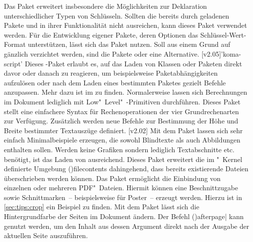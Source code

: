 \begin{DeclarePackages}
  Das Paket  erweitert insbesondere die Möglichkeiten zur 
  Deklaration unterschiedlicher Typen von Schlüsseln. Sollten die bereits durch 
  \TUDScript geladenen Pakete  und  in ihrer 
  Funktionalität nicht ausreichen, kann dieses Paket verwendet werden. Für die 
  Entwicklung eigener Pakete, deren Optionen das Schlüssel-Wert-Format 
  unterstützen, lässt sich das Paket  nutzen. Soll aus einem 
  Grund auf \KOMAScript gänzlich verzichtet werden, sind die Pakete 
   oder  eine Alternative.
[v2.05]'koma-script'
  Dieses \KOMAScript-Paket erlaubt es, auf das Laden von Klassen oder Paketen 
  direkt davor oder danach zu reagieren, um beispielsweise Paketabhängigkeiten 
  aufzulösen oder nach dem Laden eines bestimmten Paketes gezielt Befehle 
  anzupassen. Mehr dazu ist im \scrguide zu finden.
  Normalerweise lassen sich Berechnungen im Dokument lediglich mit 
  Low"~Level"~-Primitiven durchführen. Dieses Paket stellt eine 
  einfachere Syntax für Rechenoperationen der vier Grundrechenarten zur 
  Verfügung. Zusätzlich werden neue Befehle zur Bestimmung der Höhe und Breite 
  bestimmter Textauszüge definiert.
[v2.02]
  Mit dem Paket  lassen sich sehr einfach Minimalbeispiele 
  erzeugen, die sowohl Blindtexte als auch Abbildungen enthalten sollen. Werden 
  keine Grafiken sondern lediglich Textabschnitte etc. benötigt, ist das Laden 
  von  ausreichend.
  Dieses Paket erweitert die im "~Kernel definierte Umgebung 
  \Environment(){filecontents} dahingehend, 
  dass bereits existierende Dateien überschrieben werden können.
  Das Paket ermöglicht die Einbindung von einzelnen oder mehreren PDF"~Dateien.
  Hiermit können eine Beschnittzugabe sowie Schnittmarken~-- beispielsweise für 
  Poster~-- erzeugt werden. Hierzu ist in \autoref{sec:tips:crop} ein Beispiel 
  zu finden.
  Mit dem Paket lässt sich die Hintergrundfarbe der Seiten im Dokument ändern.
  Der Befehl \Macro(){afterpage|\MPValue{\dots}} 
  kann genutzt werden, um den Inhalt aus dessen Argument direkt nach der 
  Ausgabe der aktuellen Seite auszuführen.

\end{DeclarePackages}
